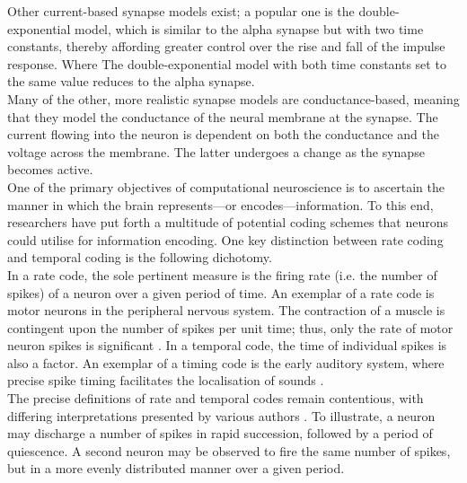 \noindent Other current-based synapse models exist; a popular one is the double-exponential model, which is similar to the alpha synapse but with two time constants, thereby affording greater control over the rise and fall of the impulse response. Where The double-exponential model with both time constants set to the same value reduces to the alpha synapse. \\

\noindent Many of the other, more realistic synapse models are conductance-based, meaning that they model the conductance of the neural membrane at the synapse. The current flowing into the neuron is dependent on both the conductance and the voltage across the membrane. The latter undergoes a change as the synapse becomes active. \\


\noindent One of the primary objectives of computational neuroscience is to ascertain the manner in which the brain represents—or encodes—information. To this end, researchers have put forth a multitude of potential coding schemes that neurons could utilise for information encoding. One key distinction between rate coding and temporal coding is the following dichotomy. \\

\noindent In a rate code, the sole pertinent measure is the firing rate (i.e. the number of spikes) of a neuron over a given period of time. An exemplar of a rate code is motor neurons in the peripheral nervous system. The contraction of a muscle is contingent upon the number of spikes per unit time; thus, only the rate of motor neuron spikes is significant \cite{gerstner1997neural}. In a temporal code, the time of individual spikes is also a factor. An exemplar of a timing code is the early auditory system, where precise spike timing facilitates the localisation of sounds \cite{chase2006spike}.\\

\noindent The precise definitions of rate and temporal codes remain contentious, with differing interpretations presented by various authors \cite{dayan2005theoretical}. To illustrate, a neuron may discharge a number of spikes in rapid succession, followed by a period of quiescence. A second neuron may be observed to fire the same number of spikes, but in a more evenly distributed manner over a given period. \\


